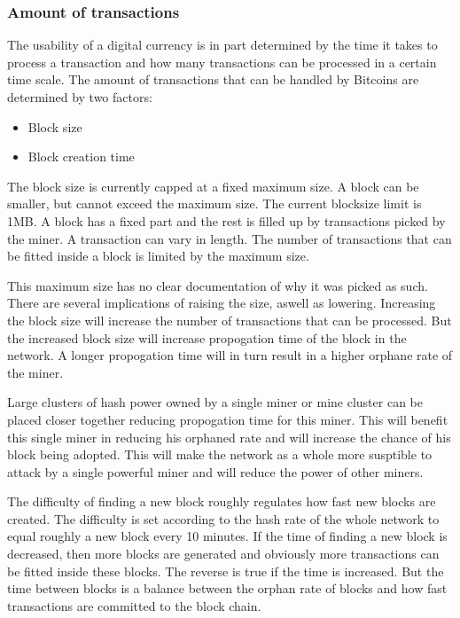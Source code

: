 \subsubsection{Amount of transactions}
The usability of a digital currency is in part determined by the time it takes to process a transaction
and how many transactions can be processed in a certain time scale.
The amount of transactions that can be handled by Bitcoins are determined by two factors:
\begin{itemize}
\item Block size
\item Block creation time
\end{itemize}

The block size is currently capped at a fixed maximum size.
A block can be smaller, but cannot exceed the maximum size.
The current blocksize limit is 1MB.
A block has a fixed part and the rest is filled up by transactions picked by the miner.
A transaction can vary in length.
The number of transactions that can be fitted inside a block is limited by the maximum size.

This maximum size has no clear documentation of why it was picked as such.
There are several implications of raising the size, aswell as lowering.
Increasing the block size will increase the number of transactions that can be processed.
But the increased block size will increase propogation time of the block in the network.
A longer propogation time will in turn result in a higher orphane rate of the miner.

Large clusters of hash power owned by a single miner or mine cluster can be placed closer together
reducing propogation time for this miner.
This will benefit this single miner in reducing his orphaned rate
and will increase the chance of his block being adopted.
This will make the network as a whole more susptible to attack by a single powerful miner
and will reduce the power of other miners.

The difficulty of finding a new block roughly regulates how fast new blocks are created.
The difficulty is set according to the hash rate of the whole network to equal roughly a new block every 10 minutes.
If the time of finding a new block is decreased,
then more blocks are generated and obviously more transactions can be fitted inside these blocks.
The reverse is true if the time is increased.
But the time between blocks is a balance between the orphan rate of blocks
and how fast transactions are committed to the block chain.


